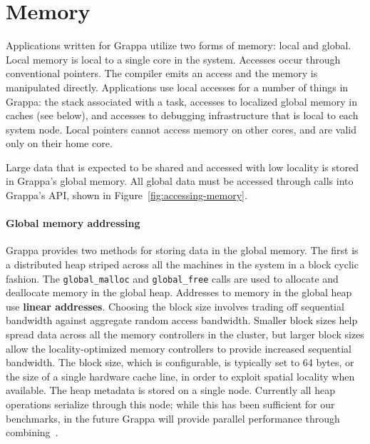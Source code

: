 \section{Memory}

Applications written for Grappa utilize two forms of memory: local and global.
Local memory is local to a single core  in
the system. Accesses occur through conventional pointers. The compiler emits
an access and the memory is manipulated directly. Applications use local
accesses for a number of things in Grappa: the stack associated with a task,
accesses to localized global memory in caches (see below), and accesses to
debugging infrastructure that is local to each system node. Local pointers
cannot access memory on other cores, and are valid only on their home core.

Large data that is expected to be shared and accessed with low locality is
stored in Grappa's global memory. All global data must be accessed through
calls into Grappa's API, shown in Figure~\ref{fig:accessing-memory}.

\paragraph{Global memory addressing} Grappa provides two methods for
storing data in the global memory. The first is a distributed heap
striped across all the machines in the system in a block cyclic fashion.
The \texttt{global\_malloc} and \texttt{global\_free} calls are used to
allocate and deallocate memory in the global heap.  Addresses to memory
in the global heap use \textbf{linear addresses}.  Choosing the block
size involves trading off sequential bandwidth against aggregate random
access bandwidth. Smaller block sizes help spread data across all the
memory controllers in the cluster, but larger block sizes allow the
locality-optimized memory controllers to provide increased sequential
bandwidth. The block size, which is configurable, is typically set to 64
bytes, or the size of a single hardware cache line, in order to exploit
spatial locality when available. The heap metadata is stored on a single
node. Currently all heap operations serialize through this node; while
this has been sufficient for our benchmarks, in the future Grappa will
provide parallel performance through combining~\cite{MAMA,flatcombining}.

